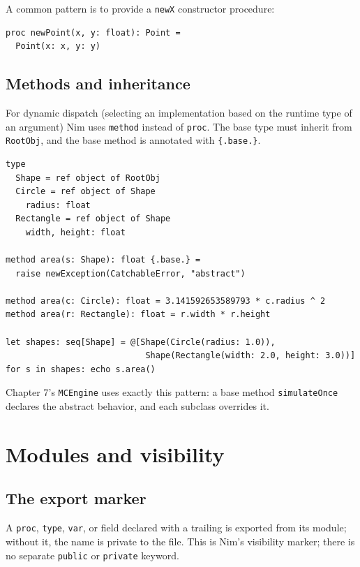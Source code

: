 \documentclass[justified, sixbynine]{tufte-book}
\def\ft{\small\tt}
\theoremstyle{plain}%
\newtheorem * {corollary}{Corollary}
\theoremstyle{definition}
\theoremstyle{remark}
\newtheorem * {remark}{Remark}
\newtheorem * {note}{Note}
\begin{document}
\begin{fullwidth}
A common pattern is to provide a {\ft newX} constructor procedure:

\begin{lstlisting}
proc newPoint(x, y: float): Point =
  Point(x: x, y: y)
\end{lstlisting}

\goodbreak\subsection{Methods and inheritance}


For dynamic dispatch (selecting an implementation based on the runtime type of an argument) Nim uses {\ft method} instead of {\ft proc}. The base type must inherit from {\ft RootObj}, and the base method is annotated with {\ft \{.base.\}}.

\begin{lstlisting}
type
  Shape = ref object of RootObj
  Circle = ref object of Shape
    radius: float
  Rectangle = ref object of Shape
    width, height: float

method area(s: Shape): float {.base.} =
  raise newException(CatchableError, "abstract")

method area(c: Circle): float = 3.141592653589793 * c.radius ^ 2
method area(r: Rectangle): float = r.width * r.height

let shapes: seq[Shape] = @[Shape(Circle(radius: 1.0)),
                            Shape(Rectangle(width: 2.0, height: 3.0))]
for s in shapes: echo s.area()
\end{lstlisting}

Chapter 7's {\ft MCEngine} uses exactly this pattern: a base method {\ft simulateOnce} declares the abstract behavior, and each subclass overrides it.

\goodbreak\section{Modules and visibility}

\goodbreak\subsection{The export marker {\ft *}}

A {\ft proc}, {\ft type}, {\ft var}, or field declared with a trailing {\ft *} is exported from its module; without it, the name is private to the file. This is Nim's visibility marker; there is no separate {\ft public} or {\ft private} keyword.


\end{fullwidth}
\end{document}
